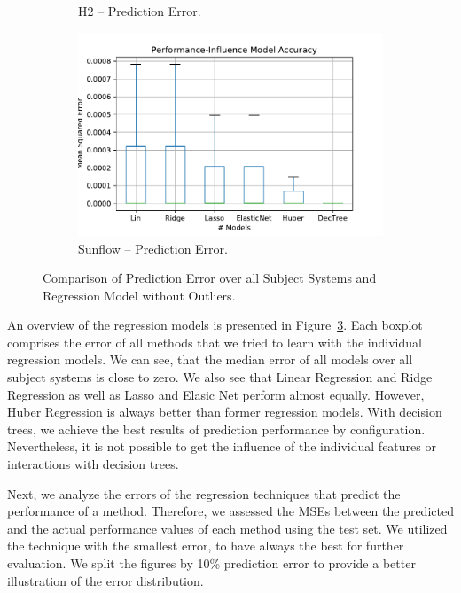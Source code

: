\begin{figure}[h]
\begin{subfigure}{.49\textwidth}
	  \caption{H2 -- Prediction Error.}
	  \label{box_model_cross_comp_h2}
	\end{subfigure}
	\begin{subfigure}{.49\textwidth}
	  \centering
	  \includegraphics[width=\textwidth]{images/Sunflow_box_regression_model_overview_without_outl}
	  \caption{Sunflow -- Prediction Error.}
	  \label{box_model_cross_comp_sunflow}
	\end{subfigure}
	\caption{Comparison of Prediction Error over all Subject Systems and Regression Model without Outliers.}
	\label{fig:regression_model_error_comparison}
\end{figure}

An overview of the regression models is presented in Figure~\ref{fig:regression_model_error_comparison}. Each boxplot comprises the error of all methods that we tried to learn with the individual regression models. We can see, that the median error of all models over all subject systems is close to zero. We also see that Linear Regression and Ridge Regression as well as Lasso and Elasic Net perform almost equally. However, Huber Regression is always better than former regression models. With decision trees, we achieve the best results of prediction performance by configuration. Nevertheless, it is not possible to get the influence of the individual features or interactions with decision trees.


Next, we analyze the errors of the regression techniques that predict the performance of a method. Therefore, we assessed the \acp{MSE} between the predicted and the actual performance values of each method using the test set. We utilized the technique with the smallest error, to have always the best for further evaluation. We split the figures by 10\% prediction error to provide a better illustration of the error distribution.

